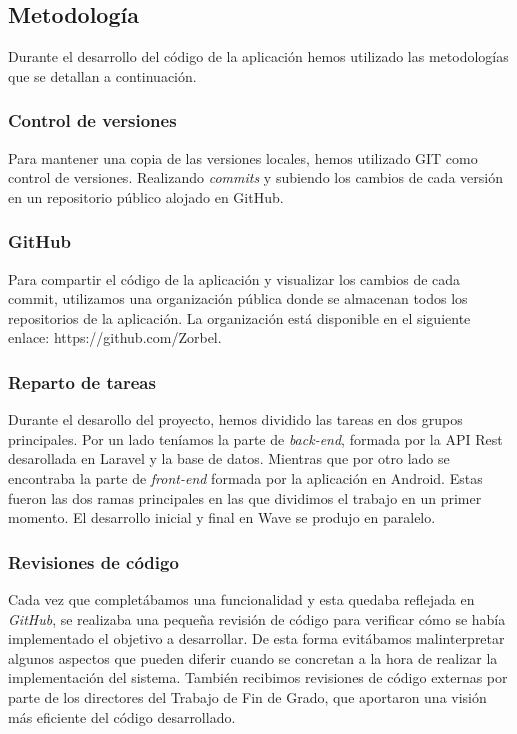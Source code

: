 \subsection{Metodología}

Durante el desarrollo del código de la aplicación hemos utilizado las metodologías que se detallan a continuación.

\subsubsection{Control de versiones}

Para mantener una copia de las versiones locales, hemos utilizado GIT como control de versiones. Realizando \textit{commits} y subiendo los cambios de cada versión en un repositorio público alojado en GitHub.

\subsubsection{GitHub}

Para compartir el código de la aplicación y visualizar los cambios de cada commit, utilizamos una organización pública donde se almacenan todos los repositorios de la aplicación. La organización está disponible en el siguiente enlace: https://github.com/Zorbel.

\subsubsection{Reparto de tareas}

Durante el desarollo del proyecto, hemos dividido las tareas en dos grupos principales. Por un lado teníamos la parte de \textit{back-end}, formada por la API Rest desarollada en Laravel y la base de datos. Mientras que por otro lado se encontraba la parte de \textit{front-end} formada por la aplicación en Android. Estas fueron las dos ramas principales en las que dividimos el trabajo en un primer momento. El desarrollo inicial y final en Wave se produjo en paralelo.

\subsubsection{Revisiones de código}

Cada vez que completábamos una funcionalidad y esta quedaba reflejada en \textit{GitHub}, se realizaba una pequeña revisión de código para verificar cómo se había implementado el objetivo a desarrollar. De esta forma evitábamos malinterpretar algunos aspectos que pueden diferir cuando se concretan a la hora de realizar la implementación del sistema. También recibimos revisiones de código externas por parte de los directores del Trabajo de Fin de Grado, que aportaron una visión más eficiente del código desarrollado.

